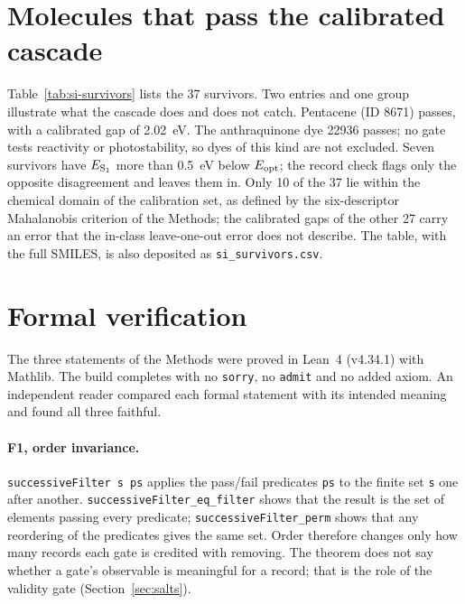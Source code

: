 \documentclass[11pt]{article}
\begin{document}
\section{Molecules that pass the calibrated cascade}
Table~\ref{tab:si-survivors} lists the 37 survivors. Two entries and one group illustrate what the cascade does and does
not catch. Pentacene (ID 8671) passes, with a calibrated gap of \qty{2.02}{eV}. The anthraquinone dye 22936 passes; no
gate tests reactivity or photostability, so dyes of this kind are not excluded. Seven survivors have
$E_{\mathrm{S_1}}$ more than \qty{0.5}{eV} below $E_{\mathrm{opt}}$; the record check flags only the opposite disagreement and leaves them in.
Only 10 of the 37 lie within the chemical domain of the calibration set, as defined by the six-descriptor Mahalanobis
criterion of the Methods; the calibrated gaps of the other 27 carry an
error that the in-class leave-one-out error does not describe. The table, with the full SMILES, is also deposited as
\texttt{si\_survivors.csv}.


\section{Formal verification}
The three statements of the Methods were proved in Lean~4 (v4.34.1) with Mathlib. The build completes with no
\texttt{sorry}, no \texttt{admit} and no added axiom. An independent reader compared each formal statement with its
intended meaning and found all three faithful.

\paragraph{F1, order invariance.} \texttt{successiveFilter s ps} applies the pass/fail predicates \texttt{ps} to the
finite set \texttt{s} one after another. \texttt{successiveFilter\_eq\_filter} shows that the result is the set of
elements passing every predicate; \texttt{successiveFilter\_perm} shows that any reordering of the predicates gives the
same set. Order therefore changes only how many records each gate is credited with removing. The theorem does not
say whether a gate's observable is meaningful for a record; that is the role of the validity gate
(Section~\ref{sec:salts}).
\end{document}

